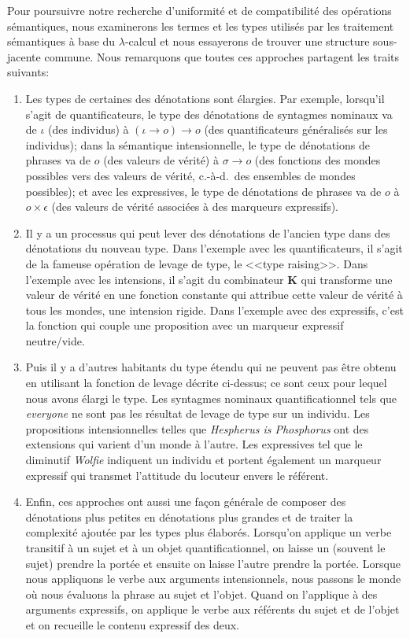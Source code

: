 Pour poursuivre notre recherche d'uniformité et de compatibilité des opérations
sémantiques, nous examinerons les termes et les types utilisés par les
traitement sémantiques à base du $\lambda$-calcul et nous essayerons de trouver
une structure sous-jacente commune. Nous remarquons que toutes ces approches
partagent les traits suivants:

\begin{enumerate}
\item \label{item:french-type-transformation} Les types de certaines des
  dénotations sont élargies. Par exemple, lorsqu'il s'agit de quantificateurs,
  le type des dénotations de syntagmes nominaux va de $\iota$ (des individus) à
  $(\iota \to o) \to o$ (des quantificateurs généralisés sur les individus);
  dans la sémantique intensionnelle, le type de dénotations de phrases va de $o$
  (des valeurs de vérité) à $\sigma \to o$ (des fonctions des mondes possibles
  vers des valeurs de vérité, c.-à-d.\ des ensembles de mondes possibles); et
  avec les expressives, le type de dénotations de phrases va de $o$ à $o \times
  \epsilon$ (des valeurs de vérité associées à des marqueurs expressifs).
\item \label{item:french-monad-eta} Il y a un processus qui peut lever des
  dénotations de l'ancien type dans des dénotations du nouveau type. Dans
  l'exemple avec les quantificateurs, il s'agit de la fameuse opération de
  levage de type, le <<type raising>>. Dans l'exemple avec les intensions,
  il s'agit du combinateur $\textbf{K}$ qui transforme une valeur de vérité en
  une fonction constante qui attribue cette valeur de vérité à tous les mondes,
  une intension rigide. Dans l'exemple avec des expressifs, c'est la fonction
  qui couple une proposition avec un marqueur expressif neutre/vide.
\item Puis il y a d'autres habitants du type étendu qui ne peuvent pas être
  obtenu en utilisant la fonction de levage décrite ci-dessus; ce sont ceux pour
  lequel nous avons élargi le type. Les syntagmes nominaux quantificationnel
  tels que \emph{everyone} ne sont pas les résultat de levage de type sur un
  individu. Les propositions intensionnelles telles que \emph{Hespherus is
    Phosphorus} ont des extensions qui varient d'un monde à l'autre. Les
  expressives tel que le diminutif \emph{Wolfie} indiquent un individu et
  portent également un marqueur expressif qui transmet l'attitude du locuteur
  envers le référent.
\item \label{item:french-monad-mu} Enfin, ces approches ont aussi une façon
  générale de composer des dénotations plus petites en dénotations plus grandes
  et de traiter la complexité ajoutée par les types plus élaborés. Lorsqu'on
  applique un verbe transitif à un sujet et à un objet quantificationnel, on
  laisse un (souvent le sujet) prendre la portée et ensuite on laisse l'autre
  prendre la portée. Lorsque nous appliquons le verbe aux arguments
  intensionnels, nous passons le monde où nous évaluons la phrase au sujet et
  l'objet. Quand on l'applique à des arguments expressifs, on applique le verbe
  aux référents du sujet et de l'objet et on recueille le contenu expressif des
  deux.
\end{enumerate}

